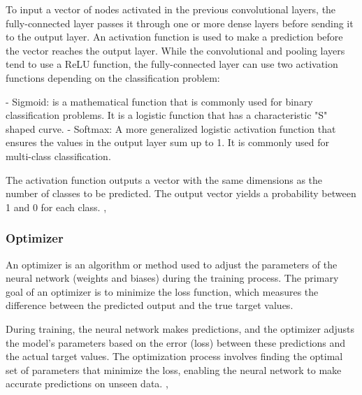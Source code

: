 \begin{itemize}
To input a vector of nodes activated in the previous convolutional layers, the fully-connected layer passes it through one or more dense layers before sending it to the output layer. An activation function is used to make a prediction before the vector reaches the output layer. While the convolutional and pooling layers tend to use a ReLU function, the fully-connected layer can use two activation functions depending on the classification problem:

- Sigmoid:  is a mathematical function that is commonly used for binary classification problems. It is a logistic function that has a characteristic "S" shaped curve.
- Softmax: A more generalized logistic activation function that ensures the values in the output layer sum up to 1. It is commonly used for multi-class classification.

The activation function outputs a vector with the same dimensions as the number of classes to be predicted. The output vector yields a probability between 1 and 0 for each class. \cite{schmidhuber2015deep}, \cite{goodfellow2016deep}\\
   
\subsubsection{Optimizer}
An optimizer is an algorithm or method used to adjust the parameters of the neural network (weights and biases) during the training process. The primary goal of an optimizer is to minimize the loss function, which measures the difference between the predicted output and the true target values.

During training, the neural network makes predictions, and the optimizer adjusts the model's parameters based on the error (loss) between these predictions and the actual target values. The optimization process involves finding the optimal set of parameters that minimize the loss, enabling the neural network to make accurate predictions on unseen data. \cite{choi2019empirical}, \cite{ansari2020building} 


\end{itemize}
